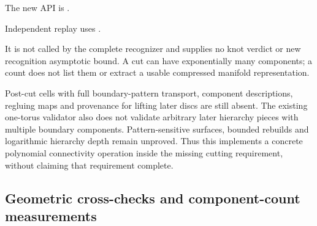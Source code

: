 The new API is .

Independent replay uses .

It is not called by
the complete recognizer and supplies no knot verdict or new recognition
asymptotic bound. A cut can have exponentially many components; a count does
not list them or extract a usable compressed manifold representation.

Post-cut cells with full boundary-pattern transport, component descriptions,
regluing maps and provenance for lifting later discs are still absent.
The existing one-torus validator also does not validate arbitrary later
hierarchy pieces with multiple boundary components. Pattern-sensitive
surfaces, bounded rebuilds and logarithmic hierarchy depth remain unproved.
Thus this implements a concrete polynomial connectivity operation inside the
missing cutting requirement, without claiming that requirement complete.

\subsection{Geometric cross-checks and component-count measurements}

